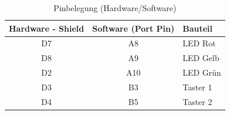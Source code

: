 \begin{table}[H]
\centering
\begin{tabular}{c|c|l}
	Hardware - Shield & Software (Port Pin) & Bauteil \\
	\hline
	\rule{0pt}{20pt}D7 & A8 & LED Rot \\
	D8 & A9 & LED Gelb \\
	D2 & A10 & LED Grün \\
	D3 & B3 & Taster 1 \\
	D4 & B5 & Taster 2 \\
	
\end{tabular}
\caption{Pinbelegung (Hardware/Software)}
\label{tab:Pinbelegung}
\end{table}

